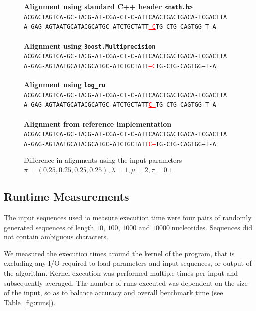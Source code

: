 \documentclass[runningheads,a4paper]{llncs}
\begin{document}
\begin{figure}

\textbf{Alignment using standard C++ header \texttt{<math.h>}}
~
\\
\texttt{ACGACTAGTCA-GC-TACG-AT-CGA-CT-C-ATTCAACTGACTGACA-TCGACTTA} \\
\texttt{A-GAG-AGTAATGCATACGCATGC-ATCTGCTATT\textcolor{red}{\underline{---C}}TG-CTG-CAGTGG--T-A}
\\~\\
\textbf{Alignment using \texttt{Boost.Multiprecision}}
~
\\
\texttt{ACGACTAGTCA-GC-TACG-AT-CGA-CT-C-ATTCAACTGACTGACA-TCGACTTA} \\
\texttt{A-GAG-AGTAATGCATACGCATGC-ATCTGCTATT\textcolor{red}{\underline{---C}}TG-CTG-CAGTGG--T-A}
\\~\\
\textbf{Alignment using \texttt{log\_ru}}
~
\\
\texttt{ACGACTAGTCA-GC-TACG-AT-CGA-CT-C-ATTCAACTGACTGACA-TCGACTTA} \\
\texttt{A-GAG-AGTAATGCATACGCATGC-ATCTGCTATT\textcolor{red}{\underline{C---}}TG-CTG-CAGTGG--T-A}
\\~\\
\textbf{Alignment from reference implementation}
~
\\
\texttt{ACGACTAGTCA-GC-TACG-AT-CGA-CT-C-ATTCAACTGACTGACA-TCGACTTA} \\
\texttt{A-GAG-AGTAATGCATACGCATGC-ATCTGCTATT\textcolor{red}{\underline{C---}}TG-CTG-CAGTGG--T-A}

\caption{Difference in alignments using the input parameters $\pi=(0.25,0.25,0.25,0.25), \lambda=1, \mu = 2, \tau = 0.1$}
\label{fig:alignments}
\end{figure}

\subsection{Runtime Measurements}

The input sequences used to measure execution time were four pairs of randomly generated sequences of length $10$, $100$, $1000$ and $10000$ nucleotides. Sequences did not contain ambiguous characters. 

We measured the execution times around the kernel of the program, that is excluding any I/O required to load parameters and input sequences, or output of the algorithm. Kernel execution was performed multiple times per input and subsequently averaged. The number of runs executed was dependent on the size of the input, so as to balance accuracy and overall benchmark time (see Table~\ref{fig:runs}). 
\end{document}
